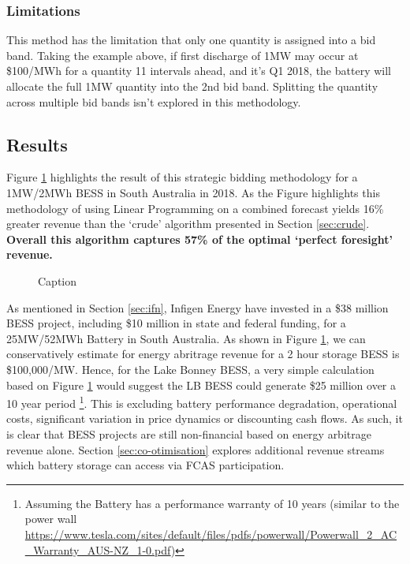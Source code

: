 \subsubsection{Limitations}
This method has the limitation that only one quantity is assigned into a bid band. Taking the example above, if first discharge of 1MW may occur at \$100/MWh for a quantity 11 intervals ahead, and it's Q1 2018, the battery will allocate the full 1MW quantity into the 2nd bid band. Splitting the quantity across multiple bid bands isn't explored in this methodology.
\newpage
\subsection{Results}
\label{sec:strategic_bidding}
Figure \ref{fig:strategic_bidding}  highlights the result of this strategic bidding methodology for a 1MW/2MWh BESS in South Australia in 2018. As the Figure highlights this methodology of using Linear Programming on a combined forecast yields 16\% greater revenue than the `crude' algorithm presented in Section \ref{sec:crude}. \textbf{ Overall this algorithm captures 57\% of the optimal `perfect foresight' revenue. }
\begin{figure}[H]
    \centering
    \caption{Caption}
    \label{fig:strategic_bidding}
\end{figure}
As mentioned in Section \ref{sec:ifn}, Infigen Energy have invested in a \$38 million BESS project, including \$10 million in state and federal funding, for a 25MW/52MWh Battery in South Australia. As shown in Figure \ref{fig:strategic_bidding}, we can conservatively estimate for energy abritrage revenue for a 2 hour storage BESS is \$100,000/MW. Hence, for the Lake Bonney BESS, a very simple calculation based on Figure \ref{fig:strategic_bidding} would suggest the LB BESS could generate \$25 million over a 10 year period \footnote{Assuming the Battery has a performance warranty of 10 years (similar to the power wall \url{https://www.tesla.com/sites/default/files/pdfs/powerwall/Powerwall_2_AC_Warranty_AUS-NZ_1-0.pdf})}. This is excluding battery performance degradation, operational costs, significant variation in price dynamics or discounting cash flows. As such, it is clear that BESS projects are still non-financial based on energy arbitrage revenue alone. Section \ref{sec:co-otimisation} explores additional revenue streams which battery storage can access via FCAS participation. 

